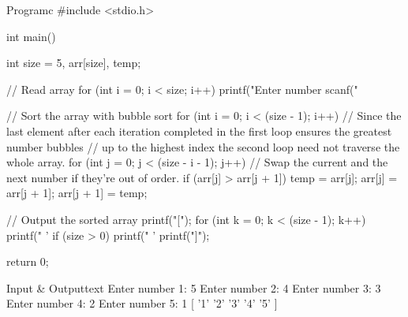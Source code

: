\documentclass[11pt]{ipu-c}
\begin{document}
    \newpage
    \begin{code}
        {Program}{c}
#include <stdio.h>

int main() {
    int size = 5, arr[size], temp;

    // Read array
    for (int i = 0; i < size; i++) {
        printf("Enter number %
        scanf("%
    }

    // Sort the array with bubble sort
    for (int i = 0; i < (size - 1); i++) {
        // Since the last element after each iteration completed in the first loop ensures the greatest number bubbles
        // up to the highest index the second loop need not traverse the whole array.
        for (int j = 0; j < (size - i - 1); j++) {
            // Swap the current and the next number if they're out of order.
            if (arr[j] > arr[j + 1]) {
                temp = arr[j];
                arr[j] = arr[j + 1];
                arr[j + 1] = temp;
            }
        }
    }

    // Output the sorted array
    printf("[");
    for (int k = 0; k < (size - 1); k++) {
        printf(" '%
    }
    if (size > 0) {
        printf(" '%
    }
    printf("]");

    return 0;
}
    \end{code}
    \begin{code}
        {Input \& Output}{text}
Enter number 1: 5
Enter number 2: 4
Enter number 3: 3
Enter number 4: 2
Enter number 5: 1
[ '1'  '2'  '3'  '4'  '5' ]
    \end{code}

\end{document}
